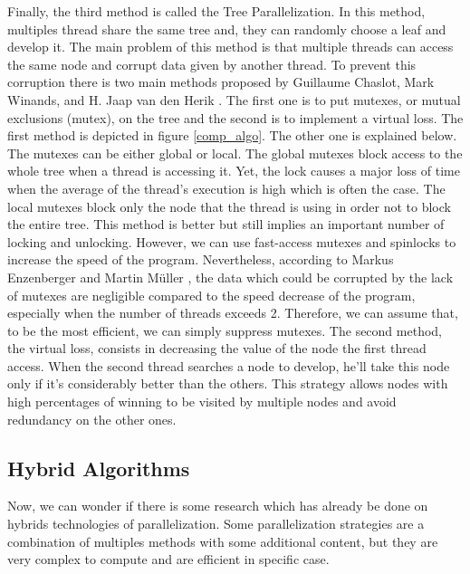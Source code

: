 Finally, the third method is called the Tree Parallelization. In this method, multiples thread share the same tree and, they can randomly choose a leaf and develop it. The main problem of this method is that multiple threads can access the same node and corrupt data given by another thread. To prevent this corruption there is two main methods proposed by Guillaume Chaslot, Mark Winands, and H. Jaap van den Herik \cite{parallel_comp}. The first one is to put mutexes, or mutual exclusions (mutex), on the tree and the second is to implement a virtual loss. The first method is depicted in figure \ref{comp_algo}. The other one is explained below.
\newline
\newline
The mutexes can be either global or local. The global mutexes block access to the whole tree when a thread is accessing it. Yet, the lock causes a major loss of time when the average of the thread’s execution is high which is often the case. The local mutexes block only the node that the thread is using in order not to block the entire tree. This method is better but still implies an important number of locking and unlocking. However, we can use fast-access mutexes and spinlocks to increase the speed of the program.
\newline
\newline
Nevertheless, according to Markus Enzenberger and Martin Müller \cite{lock-free}, the data which could be corrupted by the lack of mutexes are negligible compared to the speed decrease of the program, especially when the number of threads exceeds 2. Therefore, we can assume that, to be the most efficient, we can simply suppress mutexes.
\newline
\newline
The second method, the virtual loss, consists in decreasing the value of the node the first thread access. When the second thread searches a node to develop, he’ll take this node only if it’s considerably better than the others. This strategy allows nodes with high percentages of winning to be visited by multiple nodes and avoid redundancy on the other ones.

\subsection{Hybrid Algorithms}

Now, we can wonder if there is some research which has already be done on hybrids technologies of parallelization. Some parallelization strategies are a combination of multiples methods with some additional content, but they are very complex to compute and are efficient in specific case.


